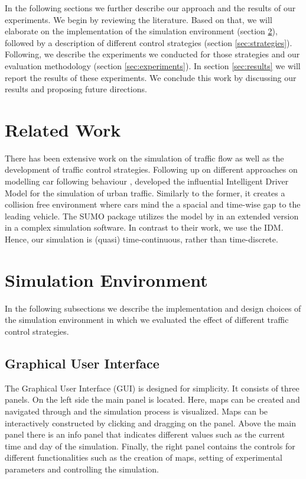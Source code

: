 \documentclass[10pt]{article}
\begin{document}
\vspace{20pt}

In the following sections we further describe our approach and the results of our experiments. We begin by reviewing the literature. Based on that, we will elaborate on the implementation of the simulation environment (section \ref{sec:envi}), followed by a description of different control strategies (section \ref{sec:strategies}). Following, we describe the experiments we conducted for those strategies and our evaluation methodology (section \ref{sec:experiments}). In section \ref{sec:results} we will report the results of these experiments.  We conclude this work by discussing our results and proposing future directions.

\section{Related Work}
\label{sec:related-work}
There has been extensive work on the simulation of traffic flow as well as the development of traffic control strategies. Following up on different approaches on modelling car following behaviour \citep[e.g.][]{gipps1981behavioural}, \citet{treiber2000congested} developed the influential Intelligent Driver Model for the simulation of urban traffic. Similarly to the former, it creates a collision free environment where cars mind the a spacial and time-wise gap to the leading vehicle. The SUMO package \citep{krajzewicz2002sumo, behrisch2011sumo} utilizes the model by \citep{gipps1981behavioural} in an extended version \citep{krauss1998microscopic} in a complex simulation software. In contrast to their work, we use the IDM. Hence, our simulation is (quasi) time-continuous, rather than time-discrete.
	
\section{Simulation Environment}
\label{sec:envi}
In the following subsections we describe the implementation and design choices of the simulation environment in which we evaluated the effect of different traffic control strategies.

\subsection{Graphical User Interface}
The Graphical User Interface (GUI) is designed for simplicity. It consists of three  panels. On the left side the main panel is located. Here, maps can be created and navigated through and the simulation process is visualized. Maps can be interactively constructed by clicking and dragging on the panel. Above the main panel there is an info panel that indicates different values such as the current time and day of the simulation. Finally, the right panel contains the controls for different functionalities such as the creation of maps, setting of experimental parameters and controlling the simulation.
\end{document}
